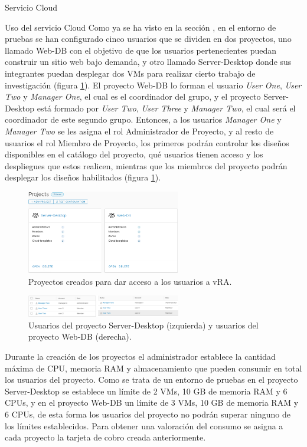 \begin{subsection}{Servicio Cloud}
\begin{subsubsection}{Uso del servicio Cloud}
        Como ya se ha visto en la sección , en el entorno de pruebas se han configurado cinco usuarios que se dividen en dos proyectos, uno llamado Web-DB con el objetivo de que los usuarios pertenecientes puedan construir un sitio web bajo demanda, y otro llamado Server-Desktop donde sus integrantes puedan desplegar dos VMs para realizar cierto trabajo de investigación (figura \ref{fig:projects-vra}). El proyecto Web-DB lo forman el usuario \textit{User One}, \textit{User Two} y \textit{Manager One}, el cual es el coordinador del grupo, y el proyecto Server-Desktop está formado por \textit{User Two}, \textit{User Three} y \textit{Manager Two}, el cual será el coordinador de este segundo grupo. Entonces, a los usuarios \textit{Manager One} y \textit{Manager Two} se les asigna el rol Administrador de Proyecto, y al resto de usuarios el rol Miembro de Proyecto, los primeros podrán controlar los diseños disponibles en el catálogo del proyecto, qué usuarios tienen acceso y los despliegues que estos realicen, mientras que los miembros del proyecto podrán desplegar los diseños habilitados (figura \ref{fig:projects-vra}).
        \begin{figure}[h]
            \centering
            \includegraphics[width=0.6\textwidth]{imaxes/pruebaconcepto/vrealize/projects-vRA.png}
            \caption{Proyectos creados para dar acceso a los usuarios a vRA.}
            \label{fig:projects-vra}
        \end{figure}
        \FloatBarrier
        \begin{figure}[h]
            \centering
            \includegraphics[width=0.6\textwidth]{imaxes/pruebaconcepto/vrealize/users-DB.png}
            \caption{Usuarios del proyecto Server-Desktop (izquierda) y usuarios del proyecto Web-DB (derecha).}
            \label{fig:project-users}
        \end{figure}
        \FloatBarrier
        Durante la creación de los proyectos el administrador establece la cantidad máxima de CPU, memoria RAM y almacenamiento que pueden consumir en total los usuarios del proyecto. Como se trata de un entorno de pruebas en el proyecto Server-Desktop se establece un límite de 2 VMs, 10 GB de memoria RAM y 6 CPUs, y en el proyecto Web-DB un límite de 3 VMs, 10 GB de memoria RAM y 6 CPUs, de esta forma los usuarios del proyecto no podrán superar ninguno de los límites establecidos. Para obtener una valoración del consumo se asigna a cada proyecto la tarjeta de cobro creada anteriormente.

\end{subsubsection}
\end{subsection}
